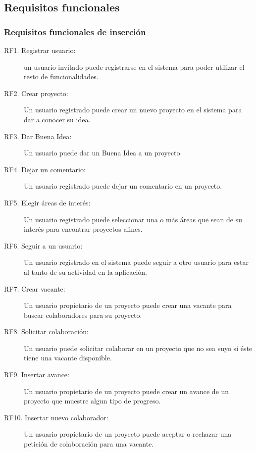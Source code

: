 \subsection*{Requisitos funcionales}
\subsubsection{Requisitos funcionales de inserción}
\begin{description}
    \item[RF1. Registrar usuario:] un usuario invitado puede registrarse en el sistema para poder utilizar el resto de funcionalidades.
    \item[RF2. Crear proyecto:] Un usuario registrado puede crear un nuevo proyecto en el sistema para dar a conocer su idea.
    \item[RF3. Dar Buena Idea:] Un usuario puede dar un Buena Idea a un proyecto
    \item[RF4. Dejar un comentario:] Un usuario registrado puede dejar un comentario en un proyecto.
    \item[RF5. Elegir áreas de interés:] Un usuario registrado puede seleccionar una o más áreas que sean de su interés para encontrar proyectos afines.
    \item[RF6. Seguir a un usuario:] Un usuario registrado en el sistema puede seguir a otro usuario para estar al tanto de su actividad en la aplicación.
    \item[RF7. Crear vacante:] Un usuario propietario de un proyecto puede crear una vacante para buscar colaboradores para su proyecto.
    \item[RF8. Solicitar colaboración:] Un usuario puede solicitar colaborar en un proyecto que no sea suyo si éste tiene una vacante disponible.
    \item[RF9. Insertar avance:] Un usuario propietario de un proyecto puede crear un avance de un proyecto que muestre algun tipo de progreso.
    \item[RF10. Insertar nuevo colaborador:] Un usuario propietario de un proyecto puede aceptar o rechazar una petición de colaboración para una vacante.
\end{description}

